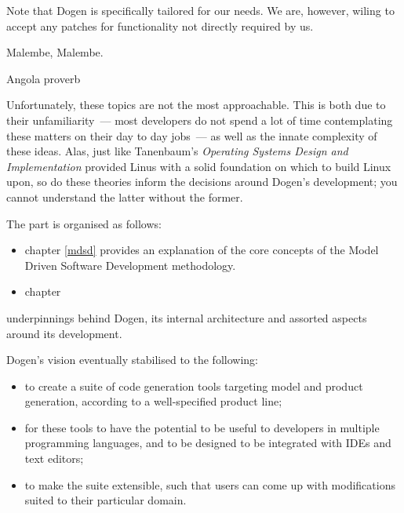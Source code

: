 \documentclass{book}
\begin{document}
Note that Dogen is specifically tailored for our needs. We are,
however, wiling to accept any patches for functionality not directly
required by us.

\epigraph{Malembe, Malembe.}{Angola proverb}

Unfortunately, these topics are not the most approachable. This is
both due to their unfamiliarity~--- most developers do not spend a lot
of time contemplating these matters on their day to day jobs~--- as
well as the innate complexity of these ideas. Alas, just like
Tanenbaum's \emph{Operating Systems Design and Implementation}
provided Linus with a solid foundation on which to build Linux upon,
so do these theories inform the decisions around Dogen's development;
you cannot understand the latter without the former.

The part is organised as follows:

\begin{itemize}
  \item chapter \ref{mdsd} provides an explanation of the core
    concepts of the Model Driven Software Development methodology.
  \item chapter
\end{itemize}

underpinnings behind Dogen, its internal architecture and assorted
aspects around its development.

Dogen's vision eventually stabilised to the following:

\begin{itemize}
\item to create a suite of code generation tools targeting model and
  product generation, according to a well-specified product line;
\item for these tools to have the potential to be useful to developers
  in multiple programming languages, and to be designed to be
  integrated with IDEs and text editors;
\item to make the suite extensible, such that users can come up with
  modifications suited to their particular domain.
\end{itemize}



\backmatter


\end{document}
